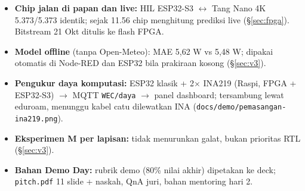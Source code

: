 \documentclass[10.5pt,a4paper]{article}
\newcommand{\cmd}[1]{\texttt{#1}}
\begin{document}
\begin{ringkas}
\begin{itemize}
  \item \textbf{Chip jalan di papan dan live:} HIL ESP32-S3 $\leftrightarrow$ Tang Nano 4K 5.373/5.373 identik; sejak 11.56 chip menghitung prediksi live (\S\ref{sec:fpga}). Bitstream 21 Okt ditulis ke flash FPGA.
  \item \textbf{Model offline} (tanpa Open-Meteo): MAE 5,62 W vs 5,48 W; dipakai otomatis di Node-RED dan ESP32 bila prakiraan kosong (\S\ref{sec:v3}).
  \item \textbf{Pengukur daya komputasi:} ESP32 klasik + 2$\times$ INA219 (Raspi, FPGA + ESP32-S3) $\to$ MQTT \cmd{WEC/daya} $\to$ panel dashboard; tersambung lewat eduroam, menunggu kabel catu dilewatkan INA (\cmd{docs/demo/pemasangan-ina219.png}).
  \item \textbf{Eksperimen M per lapisan:} tidak menurunkan galat, bukan prioritas RTL (\S\ref{sec:v3}).
  \item \textbf{Bahan Demo Day:} rubrik demo (80\% nilai akhir) dipetakan ke deck; \cmd{pitch.pdf} 11 slide + naskah, QnA juri, bahan mentoring hari 2.
\end{itemize}
\end{ringkas}
\end{document}
